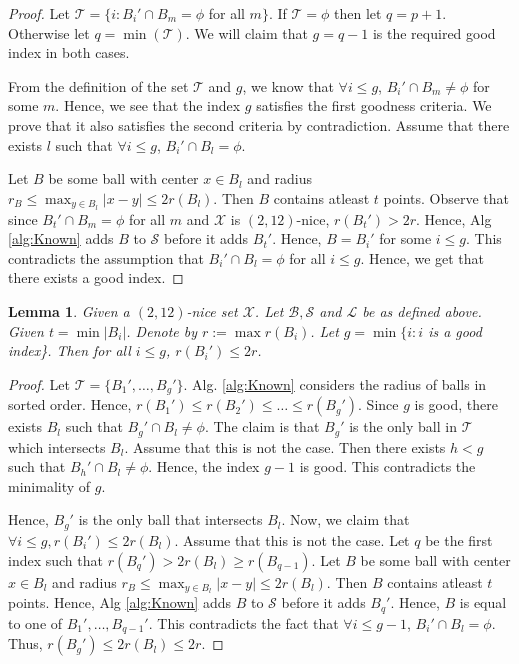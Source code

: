 \documentclass[twoside]{article}
\newcommand{\mc}{\mathcal}
\newtheorem{lemma}[theorem]{Lemma}
\begin{document}
\begin{proof}
Let $\mc T = \{i: B_i' \cap B_m = \phi$ for all $m\}$. If $\mc T = \phi$ then let $q = p+1$. Otherwise let $q = \min(\mc T)$. We will claim that $g = q-1$ is the required good index in both cases.

From the definition of the set $\mc T$ and $g$, we know that $\forall i \le g$, $B_i' \cap B_m \neq \phi$ for some $m$. Hence, we see that the index $g$ satisfies the first goodness criteria. We prove that it also satisfies the second criteria by contradiction. Assume that there exists $l$ such that $\forall i \le g$, $B_i' \cap B_l = \phi$.

Let $B$ be some ball with center $x \in B_l$ and radius $r_B \le \max_{y \in B_l} |x-y| \le 2r(B_l)$. Then $B$ contains atleast $t$ points. Observe that since $B_t' \cap B_m = \phi$ for all $m$ and $\mc X$ is $(2,12)$-nice, $r(B_t') > 2r$. Hence, Alg \ref{alg:Known} adds $B$ to $\mc S$ before it adds $B_t'$. Hence, $B = B_i'$ for some $i\le g$. This contradicts the assumption that $B_i' \cap B_l = \phi$ for all $i \le g$. Hence, we get that there exists a good index. 
\end{proof}


\begin{lemma}
Given a $(2,12)$-nice set $\mc X$. Let $\mc B, \mc S$ and $\mc L$ be as defined above. Given $t = \min |B_i|$. Denote by $r := \max r(B_i)$. Let $g = \min \{i: i$ is a good index\}. Then for all $i\le g$, $r(B_i') \le 2r$.

\label{lemma:centerDist}
\end{lemma}

\begin{proof}
Let $\mc T = \{B_1', \ldots, B_g'\}$. Alg. \ref{alg:Known} considers the radius of balls in sorted order. Hence, $r(B_1') \le r(B_2') \le \ldots \le r(B_g')$. Since $g$ is good, there exists $B_l$ such that $B_g' \cap B_l \neq \phi$. The claim is that $B_g'$ is the only ball in $\mc T$ which intersects $B_l$. Assume that this is not the case. Then there exists $h < g$ such that $B_h' \cap B_l \neq \phi$. Hence, the index $g-1$ is good. This contradicts the minimality of $g$. 

Hence, $B_g'$ is the only ball that intersects $B_l$. Now, we claim that $\forall i \le g, r(B_i') \le 2r(B_l)$. Assume that this is not the case. Let $q$ be the first index such that $r(B_q') > 2r(B_l) \ge r(B_{q-1})$. Let $B$ be some ball with center $x \in B_l$ and radius $r_B \le \max_{y \in B_l} |x-y| \le 2r(B_l)$. Then $B$ contains atleast $t$ points. Hence, Alg \ref{alg:Known} adds $B$ to $\mc S$ before it adds $B_q'$. Hence, $B$ is equal to one of $B_1', \ldots, B_{q-1}'$. This contradicts the fact that $\forall i \le g-1$, $B_i' \cap B_l = \phi$. Thus, $r(B_g') \le 2r(B_l) \le 2r$. 
\end{proof}
\end{document}
